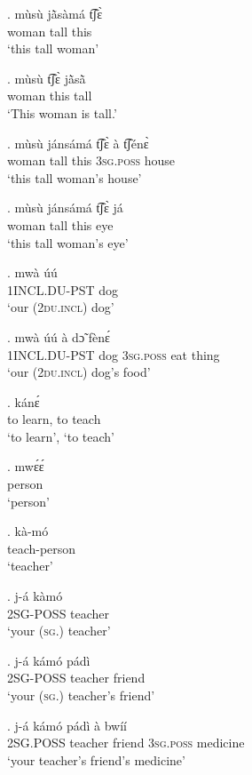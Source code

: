 \documentclass{assets/fieldnotes}
\begin{document}

\exg. mùsù jã̀sàmá t͡ʃɛ̀\\
woman tall this\\
`this tall woman’

\exg. mùsù t͡ʃɛ̀ jã̀sã̀\\
woman this tall\\
`This woman is tall.’

\exg. mùsù jánsámá t͡ʃɛ̀ à t͡ʃénɛ̀\\
woman tall this \textsc{3sg.poss} house\\
`this tall woman’s house’

\exg. mùsù jánsámá t͡ʃɛ̀ já\\
woman tall this eye\\
`this tall woman’s eye’

\exg. mwà úú\\
\textsc{1INCL.DU-PST} dog\\
`our (\textsc{2du.incl}) dog’

\exg. mwà úú à dɔ̃ fènɛ́\\
\textsc{1INCL.DU-PST} dog \textsc{3sg.poss} eat thing\\
`our (\textsc{2du.incl}) dog’s food'

\exg. kánɛ́\\
to learn, to teach\\
`to learn’, `to teach’

\exg. mwɛ́ɛ́\\
person\\
`person’

\exg. kà-mó\\
teach-person\\
`teacher’\\

\exg. j-á kàmó\\
\textsc{2SG-POSS} teacher\\
`your (\textsc{sg.}) teacher’

\exg. j-á kámó pádì\\
\textsc{2SG-POSS} teacher friend\\
`your (\textsc{sg.}) teacher’s friend’

\exg. j-á kámó pádì à bwíí\\
\textsc{2SG.POSS} teacher friend \textsc{3sg.poss} medicine\\
`your teacher’s friend’s medicine’

\newpage 
\end{document}
